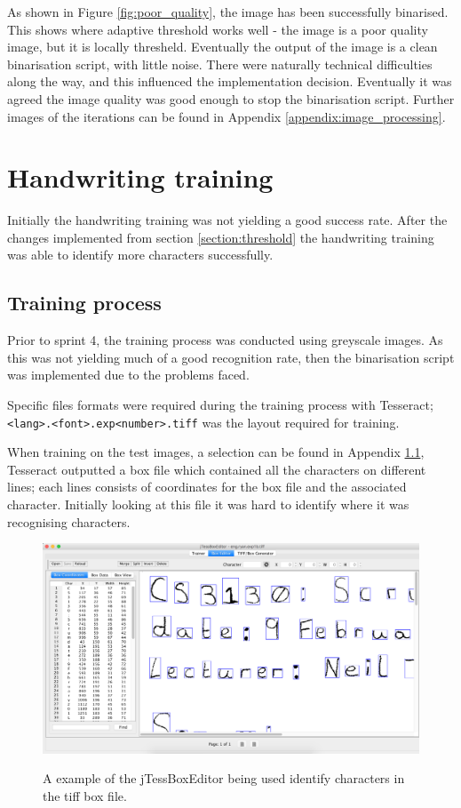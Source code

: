 As shown in Figure \ref{fig:poor_quality}, the image has been successfully binarised. This shows where adaptive threshold works well - the image is a poor quality image, but it is locally thresheld. Eventually the output of the image is a clean binarisation script, with little noise. There were naturally technical difficulties along the way, and this influenced the implementation decision. Eventually it was agreed the image quality was good enough to stop the binarisation script. Further images of the iterations can be found in Appendix \ref{appendix:image_processing}.

\section{Handwriting training}
Initially the handwriting training was not yielding a good success rate. After the changes implemented from section \ref{section:threshold} the handwriting training was able to identify more characters successfully.

\subsection{Training process}
Prior to sprint 4, the training process was conducted using greyscale images. As this was not yielding much of a good recognition rate, then the binarisation script was implemented due to the problems faced.

Specific files formats were required during the training process with Tesseract; \texttt{<lang>.<font>.exp<number>.tiff} was the layout required for training.

When training on the test images, a selection can be found in Appendix \ref{}, Tesseract outputted a box file which contained all the characters on different lines; each lines consists of coordinates for the box file and the associated character. Initially looking at this file it was hard to identify where it was recognising characters.

\begin{figure}[H]
  \centering
  \includegraphics[width=\textwidth]{images/box_editor}
  \label{fig:box_editor}
  \caption{A example of the jTessBoxEditor being used identify characters in the tiff box file.}
\end{figure}

